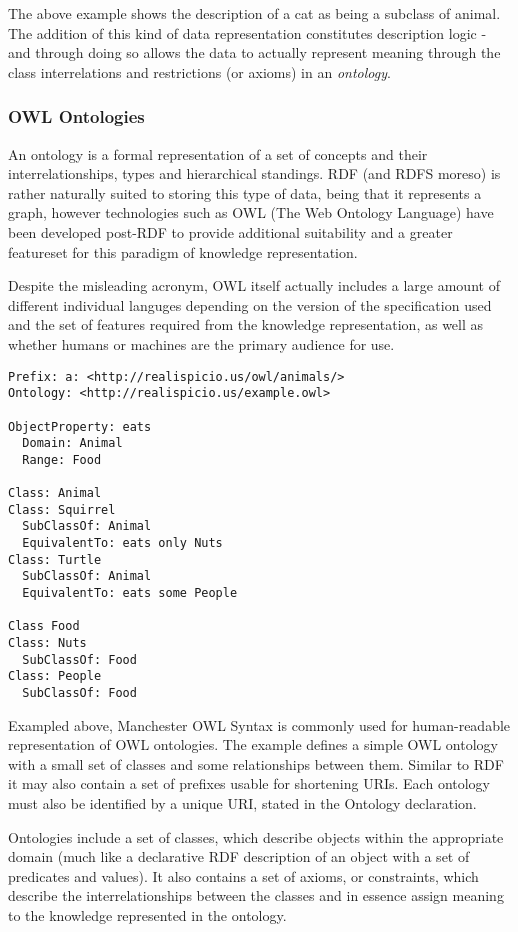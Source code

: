 \documentclass{article}
\begin{document}
The above example shows the description of a cat as being a subclass of animal.
The addition of this kind of data representation constitutes description
logic\cite{desclogic} - and through doing so allows the data to actually
represent meaning through the class interrelations and restrictions (or axioms)
in an \emph{ontology}.

\subsubsection{OWL Ontologies}

An ontology is a formal representation of a set of concepts and their
interrelationships, types and hierarchical standings. RDF (and RDFS moreso) is
rather naturally suited to storing this type of data, being that it represents 
a graph, however technologies such as OWL (The Web Ontology Language) have been 
developed post-RDF to provide additional suitability and a greater featureset 
for this paradigm of knowledge representation.

Despite the misleading acronym, OWL itself actually includes a large amount of
different individual languges depending on the version of the specification used
and the set of features required from the knowledge representation, as well as
whether humans or machines are the primary audience for use. 

\begin{lstlisting}
Prefix: a: <http://realispicio.us/owl/animals/>
Ontology: <http://realispicio.us/example.owl>

ObjectProperty: eats
  Domain: Animal
  Range: Food

Class: Animal
Class: Squirrel
  SubClassOf: Animal
  EquivalentTo: eats only Nuts
Class: Turtle
  SubClassOf: Animal
  EquivalentTo: eats some People

Class Food
Class: Nuts
  SubClassOf: Food
Class: People
  SubClassOf: Food
\end{lstlisting}

Exampled above, Manchester OWL Syntax is commonly used for human-readable
representation of OWL ontologies. The example defines a simple OWL ontology with
a small set of classes and some relationships between them. Similar to RDF it
may also contain a set of prefixes usable for shortening URIs. Each ontology
must also be identified by a unique URI, stated in the Ontology declaration.

Ontologies include a set of classes, which describe objects within the appropriate 
domain (much like a declarative RDF description of an object with a set of predicates 
and values). It also contains a set of axioms, or constraints, which describe the 
interrelationships between the classes and in essence assign meaning to the
knowledge represented in the ontology.
\end{document}
